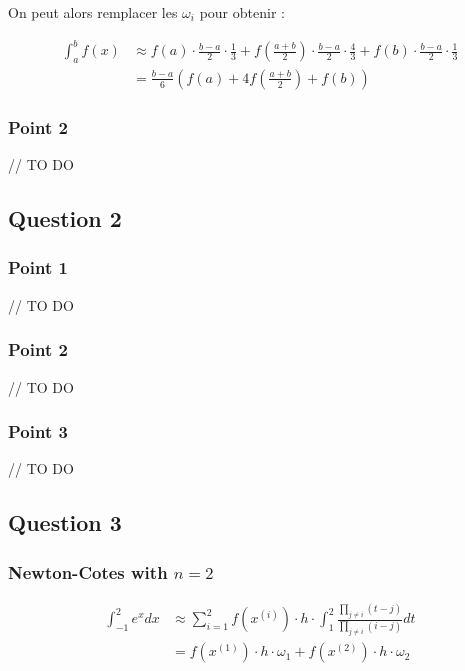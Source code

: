 On peut alors remplacer les $\omega_i$ pour obtenir :

\begin{equation}
	\begin{aligned}
		\int_a^b f(x) &\approx f(a) \cdot \frac{b-a}{2} \cdot \frac{1}{3} + f(\frac{a+b}{2}) \cdot \frac{b-a}{2} \cdot \frac{4}{3} + f(b) \cdot \frac{b-a}{2} \cdot \frac{1}{3} \\
		&= \frac{b-a}{6} \left (f(a) + 4f(\frac{a+b}{2})+f(b) \right )
	\end{aligned}
\end{equation}

\subsubsection{Point 2}

// TO DO

\subsection{Question 2}

\subsubsection{Point 1}

// TO DO

\subsubsection{Point 2}

// TO DO

\subsubsection{Point 3}

// TO DO


\subsection{Question 3}

\subsubsection{Newton-Cotes with $n = 2$}

\begin{equation}
	\begin{aligned}
		\int_{-1}^2 e^x dx &\approx \sum_{i=1}^2 f(x^{(i)}) \cdot h \cdot \int_1^2\frac{\prod_{j \neq i}(t-j)}{\prod_{j \neq i} (i - j)} dt\\
		&= f(x^{(1)}) \cdot h \cdot \omega_1 + f(x^{(2)}) \cdot h \cdot \omega_2
	\end{aligned}
\end{equation}

